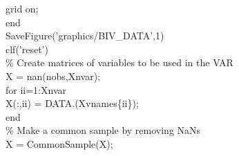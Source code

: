 \hspace{1mm}\hspace{5mm} \hspace{5mm} \hspace{5mm} grid on;  \\ 
\hspace{1mm}\hspace{5mm} \hspace{5mm} \textcolor{matlabblue}{end} \\ 
\hspace{1mm}\hspace{5mm} \hspace{5mm} SaveFigure(\textcolor{matlabpurple}{'graphics/BIV\_DATA'},1) \\ 
\hspace{1mm}\hspace{5mm} \hspace{5mm} clf(\textcolor{matlabpurple}{'reset'}) \\ 
\hspace{1mm}\hspace{5mm} \hspace{5mm} \textcolor{matlabgreen}{\% Create matrices of variables to be used in the VAR }\\ 
\hspace{1mm}\hspace{5mm} \hspace{5mm} X = nan(nobs,Xnvar); \\ 
\hspace{1mm}\hspace{5mm} \hspace{5mm} \textcolor{matlabblue}{for} ii=1:Xnvar \\ 
\hspace{1mm}\hspace{5mm} \hspace{5mm} \hspace{5mm} X(:,ii) = DATA.(Xvnames\{ii\}); \\ 
\hspace{1mm}\hspace{5mm} \hspace{5mm} \textcolor{matlabblue}{end} \\ 
\hspace{1mm}\hspace{5mm} \hspace{5mm} \textcolor{matlabgreen}{\% Make a common sample by removing NaNs }\\ 
\hspace{1mm}\hspace{5mm} \hspace{5mm} X = CommonSample(X); \\ 
